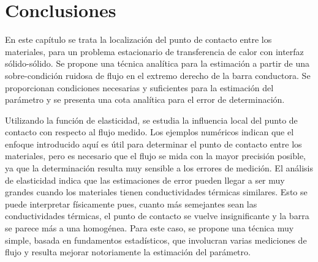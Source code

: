 \section{Conclusiones} \label{sec:Conclusiones7}

En este cap\'itulo se trata la localizaci\'on del punto de contacto entre los materiales, para un problema estacionario de transferencia de calor con interfaz s\'olido-s\'olido. 
Se propone una t\'ecnica anal\'itica para la estimaci\'on a partir de una sobre-condici\'on ruidosa de flujo en el extremo derecho de la barra conductora. Se proporcionan condiciones necesarias y suficientes
para la estimaci\'on del par\'ametro y se presenta una cota anal\'itica para el error de determinaci\'on. 

Utilizando la funci\'on de elasticidad, se estudia la influencia local del punto de contacto con respecto al flujo medido.
Los ejemplos num\'ericos indican que el enfoque introducido aqu\'i es \'util para determinar el punto de contacto entre los materiales, pero es necesario que el flujo se mida con la mayor precisi\'on posible, ya que la determinaci\'on resulta muy sensible a los errores de medici\'on. 
El an\'alisis de elasticidad indica que las estimaciones de error pueden llegar a ser muy grandes cuando los materiales tienen conductividades t\'ermicas similares. Esto se puede interpretar f\'isicamente pues, cuanto m\'as semejantes sean las conductividades t\'ermicas, el punto de contacto se vuelve insignificante y la barra se parece m\'as a una homog\'enea.
Para este caso, se propone una t\'ecnica muy simple, basada en fundamentos estad\'isticos, que involucran varias mediciones de flujo y resulta mejorar notoriamente la estimaci\'on del par\'ametro.   

